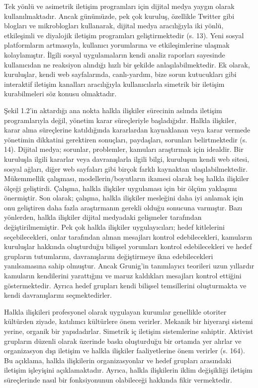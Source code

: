 \documentclass[
]{book}
\begin{document}
Tek yönlü ve asimetrik iletişim programları için dijital medya yaygın olarak kullanılmaktadır. Ancak günümüzde, pek çok kuruluş, özellikle Twitter gibi blogları ve mikroblogları kullanarak, dijital medya aracılığıyla iki yönlü, etkileşimli ve diyalojik iletişim programları geliştirmektedir (s. 13). \citep{grunig2009paradigms} Yeni sosyal platformların artmasıyla, kullanıcı yorumlarına ve etkileşimlerine ulaşmak kolaylamıştır. İlgili sosyal uygulamaların kendi analiz raporları sayesinde kullanıcıdan ne reaksiyon alındığı hızlı bir şekilde anlaşılabilmektedir. Ek olarak, kuruluşlar, kendi web sayfalarında, canlı-yardım, bize sorun kutucukları gibi interaktif iletişim kanalları aracılığıyla kullanıcılarla simetrik bir iletişim kurabilmeleri söz konusu olmaktadır.

Şekil 1.2'in aktardığı ana nokta halkla ilişkiler sürecinin aslında iletişim programlarıyla değil, yönetim karar süreçleriyle başladığıdır. Halkla ilişkiler, karar alma süreçlerine katıldığında kararlardan kaynaklanan veya karar vermede yönetimin dikkatini gerektiren sonuçları, paydaşları, sorunları belirtmektedir (s. 14). \citep{grunig2009paradigms} Dijital medya; sorunlar, problemler, kamuları araştırmak için idealdir. Bir kuruluşla ilgili kararlar veya davranışlarla ilgili bilgi, kuruluşun kendi web sitesi, sosyal ağları, diğer web sayfaları gibi birçok farklı kaynaktan ulaşılabilmektedir. Mükemmellik çalışması, modellerin/boyutların ikamesi olarak beş halkla ilişkiler ölçeği geliştirdi. Çalışma, halkla ilişkiler uygulaması için bir ölçüm yaklaşımı önermiştir. Son olarak; çalışma, halkla ilişkiler mesleğini daha iyi anlamak için onu geliştiren daha fazla araştırmanın gerekli olduğu sonucuna varmıştır. Bazı yönlerden, halkla ilişkiler dijital medyadaki gelişmeler tarafından değiştirilmemiştir. Pek çok halkla ilişkiler uygulayıcıları; hedef kitlelerini seçebilecekleri, onlar tarafından alınan mesajları kontrol edebilecekleri, kamuların kuruluşlar hakkında oluşturduğu bilişsel yorumları kontrol edebilecekleri ve hedef grupların tutumlarını, davranışlarını değiştirmeye ikna edebilecekleri yanılsamasına sahip olmuştur. Ancak Grunig'in tanımlayıcı teorileri uzun yıllardır kamuların kendilerini yarattığını ve maruz kaldıkları mesajları kontrol ettiğini göstermektedir. Ayrıca hedef grupları kendi bilişsel temsillerini oluşturmakta ve kendi davranışlarını seçmektedirler.

Halkla ilişkileri profesyonel olarak uygulayan kurumlar genellikle otoriter kültürden ziyade, katılımcı kültürlere önem verirler. Mekanik bir hiyerarşi sistemi yerine, organik bir yapıdadırlar. Simetrik iç iletişim sistemlerine sahiptir. Aktivist grupların düzenli olarak üzerinde baskı oluşturduğu bir ortamda yer alırlar ve organizasyon dışı iletişim ve halkla ilişkiler faaliyetlerine önem verirler (s. 164). \citep{grunig1995models} Bu açıklama, halkla ilişkilerin organizasyonlar ve hedef grupları arasındaki iletişim işleyişini açıklamaktadır. Ayrıca, halkla ilişkilerin iklim değişikliği iletişim süreçlerinde nasıl bir fonksiyonunun olabileceği hakkında fikir vermektedir.
\end{document}
